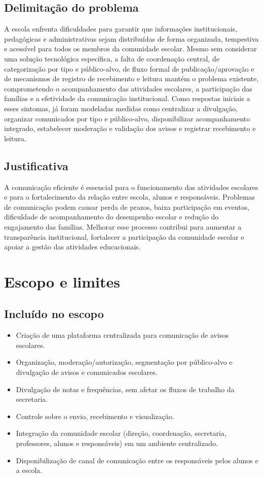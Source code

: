 \documentclass[a4paper,12pt]{report}
\begin{document}
\subsection{Delimitação do problema}
A escola enfrenta dificuldades para garantir que informações institucionais, pedagógicas e administrativas sejam distribuídas de forma organizada, tempestiva e acessível para todos os membros da comunidade escolar. Mesmo sem considerar uma solução tecnológica específica, a falta de coordenação central, de categorização por tipo e público-alvo, de fluxo formal de publicação/aprovação e de mecanismos de registro de recebimento e leitura mantém o problema existente, comprometendo o acompanhamento das atividades escolares, a participação das famílias e a efetividade da comunicação institucional. Como respostas iniciais a esses sintomas, já foram modeladas medidas como centralizar a divulgação, organizar comunicados por tipo e público-alvo, disponibilizar acompanhamento integrado, estabelecer moderação e validação dos avisos e registrar recebimento e leitura.

\subsection{Justificativa}
A comunicação eficiente é essencial para o funcionamento das atividades escolares e para o fortalecimento da relação entre escola, alunos e responsáveis. Problemas de comunicação podem causar perda de prazos, baixa participação em eventos, dificuldade de acompanhamento do desempenho escolar e redução do engajamento das famílias. Melhorar esse processo contribui para aumentar a transparência institucional, fortalecer a participação da comunidade escolar e apoiar a gestão das atividades educacionais.

\section{Escopo e limites}

\subsection{Incluído no escopo}
\begin{itemize}
    \item Criação de uma plataforma centralizada para comunicação de avisos escolares.
    \item Organização, moderação/autorização, segmentação por público-alvo e divulgação de avisos e comunicados escolares.
    \item Divulgação de notas e frequências, sem afetar os fluxos de trabalho da secretaria.
    \item Controle sobre o envio, recebimento e visualização.
    \item Integração da comunidade escolar (direção, coordenação, secretaria, professores, alunos e responsáveis) em um ambiente centralizado.
    \item Disponibilização de canal de comunicação entre os responsáveis pelos alunos e a escola.
\end{itemize}
\end{document}

